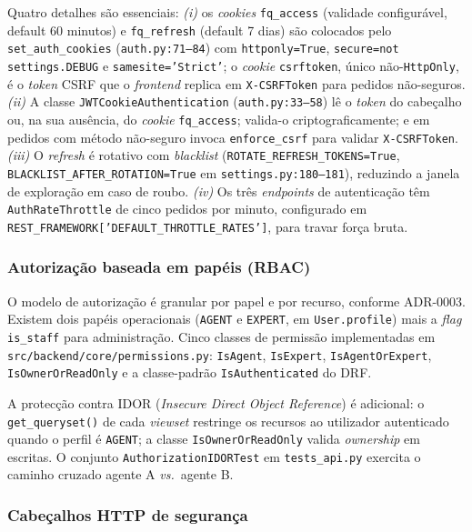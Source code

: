 Quatro detalhes são essenciais: \emph{(i)} os \emph{cookies}
\texttt{fq\_access} (validade configurável, default 60 minutos) e
\texttt{fq\_refresh} (default 7 dias) são colocados pelo
\texttt{set\_auth\_cookies} (\texttt{auth.py:71--84}) com
\texttt{httponly=True}, \texttt{secure=not settings.DEBUG} e
\texttt{samesite='Strict'}; o \emph{cookie} \texttt{csrftoken},
único não-\texttt{HttpOnly}, é o \emph{token} CSRF que o
\emph{frontend} replica em \texttt{X-CSRFToken} para pedidos
não-seguros.
\emph{(ii)} A classe \texttt{JWTCookieAuthentication}
(\texttt{auth.py:33--58}) lê o \emph{token} do cabeçalho ou, na sua
ausência, do \emph{cookie} \texttt{fq\_access}; valida-o
criptograficamente; e em pedidos com método não-seguro invoca
\texttt{enforce\_csrf} para validar \texttt{X-CSRFToken}.
\emph{(iii)} O \emph{refresh} é rotativo com \emph{blacklist}
(\texttt{ROTATE\_REFRESH\_TOKENS=True},
\texttt{BLACKLIST\_AFTER\_ROTATION=True} em \texttt{settings.py:180--181}),
reduzindo a janela de exploração em caso de roubo.
\emph{(iv)} Os três \emph{endpoints} de autenticação têm
\texttt{AuthRateThrottle} de cinco pedidos por minuto, configurado
em \texttt{REST\_FRAMEWORK['DEFAULT\_THROTTLE\_RATES']}, para travar
força bruta.

\subsubsection{Autorização baseada em papéis (RBAC)}
\label{sec:rbac}

O modelo de autorização é granular por papel e por recurso, conforme
ADR-0003. Existem dois papéis operacionais (\texttt{AGENT} e
\texttt{EXPERT}, em \texttt{User.profile}) mais a \emph{flag}
\texttt{is\_staff} para administração. Cinco classes de permissão
implementadas em \texttt{src/backend/core/permissions.py}:
\texttt{IsAgent}, \texttt{IsExpert}, \texttt{IsAgentOrExpert},
\texttt{IsOwnerOrReadOnly} e a classe-padrão \texttt{IsAuthenticated}
do DRF.

A protecção contra IDOR (\emph{Insecure Direct Object Reference}) é
adicional: o \texttt{get\_queryset()} de cada \emph{viewset} restringe
os recursos ao utilizador autenticado quando o perfil é
\texttt{AGENT}; a classe \texttt{IsOwnerOrReadOnly} valida
\emph{ownership} em escritas. O conjunto \texttt{AuthorizationIDORTest}
em \texttt{tests\_api.py} exercita o caminho cruzado agente A
\emph{vs.}\ agente B.

\subsubsection{Cabeçalhos HTTP de segurança}
\label{sec:http-headers}

